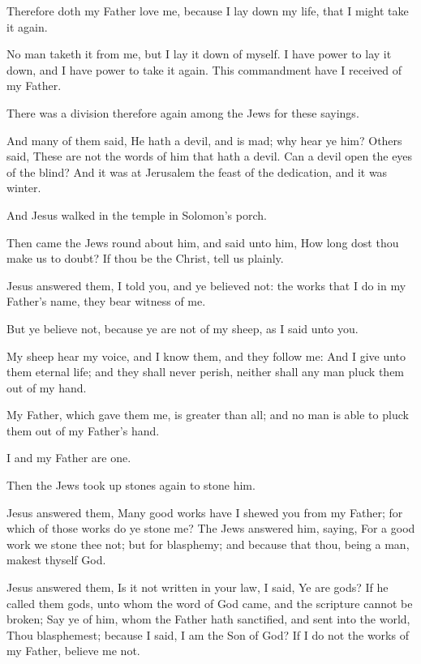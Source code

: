 \verse Therefore doth my Father love me, because I lay down my life, that I might take it again.

\verse No man taketh it from me, but I lay it down of myself. I have power to lay it down, and I have power to take it again. This commandment have I received of my Father.

\verse There was a division therefore again among the Jews for these sayings.

\verse And many of them said, He hath a devil, and is mad; why hear ye him?  \verse Others said, These are not the words of him that hath a devil. Can a devil open the eyes of the blind?  \verse And it was at Jerusalem the feast of the dedication, and it was winter.

\verse And Jesus walked in the temple in Solomon's porch.

\verse Then came the Jews round about him, and said unto him, How long dost thou make us to doubt? If thou be the Christ, tell us plainly.

\verse Jesus answered them, I told you, and ye believed not: the works that I do in my Father's name, they bear witness of me.

\verse But ye believe not, because ye are not of my sheep, as I said unto you.

\verse My sheep hear my voice, and I know them, and they follow me: \verse And I give unto them eternal life; and they shall never perish, neither shall any man pluck them out of my hand.

\verse My Father, which gave them me, is greater than all; and no man is able to pluck them out of my Father's hand.

\verse I and my Father are one.

\verse Then the Jews took up stones again to stone him.

\verse Jesus answered them, Many good works have I shewed you from my Father; for which of those works do ye stone me?  \verse The Jews answered him, saying, For a good work we stone thee not; but for blasphemy; and because that thou, being a man, makest thyself God.

\verse Jesus answered them, Is it not written in your law, I said, Ye are gods?  \verse If he called them gods, unto whom the word of God came, and the scripture cannot be broken; \verse Say ye of him, whom the Father hath sanctified, and sent into the world, Thou blasphemest; because I said, I am the Son of God?  \verse If I do not the works of my Father, believe me not.

